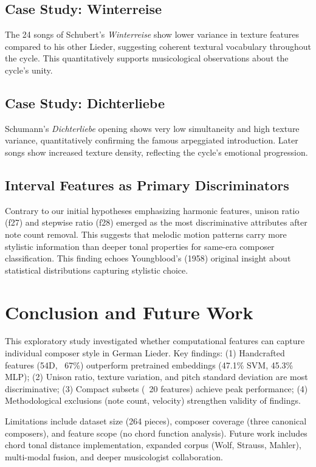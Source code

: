 \documentclass{article}
\begin{document}
\subsection{Case Study: Winterreise}

The 24 songs of Schubert's \textit{Winterreise} show lower variance in texture features compared to his other Lieder, suggesting coherent textural vocabulary throughout the cycle. This quantitatively supports musicological observations about the cycle's unity.

\subsection{Case Study: Dichterliebe}

Schumann's \textit{Dichterliebe} opening shows very low simultaneity and high texture variance, quantitatively confirming the famous arpeggiated introduction. Later songs show increased texture density, reflecting the cycle's emotional progression.

\subsection{Interval Features as Primary Discriminators}

Contrary to our initial hypotheses emphasizing harmonic features, unison ratio (f27) and stepwise ratio (f28) emerged as the most discriminative attributes after note count removal. This suggests that melodic motion patterns carry more stylistic information than deeper tonal properties for same-era composer classification. This finding echoes Youngblood's (1958) original insight about statistical distributions capturing stylistic choice.

\section{Conclusion and Future Work}\label{sec:conclusion}

This exploratory study investigated whether computational features can capture individual composer style in German Lieder. Key findings: (1) Handcrafted features (54D, ~67\%) outperform pretrained embeddings (47.1\% SVM, 45.3\% MLP); (2) Unison ratio, texture variation, and pitch standard deviation are most discriminative; (3) Compact subsets (~20 features) achieve peak performance; (4) Methodological exclusions (note count, velocity) strengthen validity of findings.

Limitations include dataset size (264 pieces), composer coverage (three canonical composers), and feature scope (no chord function analysis). Future work includes chord tonal distance implementation, expanded corpus (Wolf, Strauss, Mahler), multi-modal fusion, and deeper musicologist collaboration.
\end{document}
